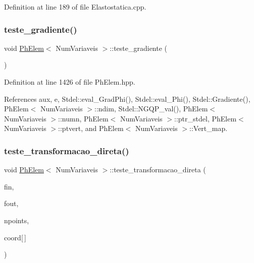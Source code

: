 Definition at line 189 of file Elastostatica.\+cpp.

\mbox{\label{classPhElem_adc3411d8b3a88f04004b6d48e64e9334}} 
\subsubsection{\texorpdfstring{teste\+\_\+gradiente()}{teste\_gradiente()}}
{\footnotesize\ttfamily void \hyperlink{classPhElem}{Ph\+Elem}$<$ Num\+Variaveis $>$\+::teste\+\_\+gradiente (\begin{DoxyParamCaption}{ }\end{DoxyParamCaption})\hspace{0.3cm}{\ttfamily [inherited]}}



Definition at line 1426 of file Ph\+Elem.\+hpp.



References aux, e, Stdel\+::eval\+\_\+\+Grad\+Phi(), Stdel\+::eval\+\_\+\+Phi(), Stdel\+::\+Gradiente(), Ph\+Elem$<$ Num\+Variaveis $>$\+::ndim, Stdel\+::\+N\+G\+Q\+P\+\_\+val(), Ph\+Elem$<$ Num\+Variaveis $>$\+::numn, Ph\+Elem$<$ Num\+Variaveis $>$\+::ptr\+\_\+stdel, Ph\+Elem$<$ Num\+Variaveis $>$\+::ptvert, and Ph\+Elem$<$ Num\+Variaveis $>$\+::\+Vert\+\_\+map.

\mbox{\label{classPhElem_a68e2ff863aa38d90933fc033e1fcec0e}} 
\subsubsection{\texorpdfstring{teste\+\_\+transformacao\+\_\+direta()}{teste\_transformacao\_direta()}}
{\footnotesize\ttfamily void \hyperlink{classPhElem}{Ph\+Elem}$<$ Num\+Variaveis $>$\+::teste\+\_\+transformacao\+\_\+direta (\begin{DoxyParamCaption}\item[{F\+I\+LE $\ast$}]{fin,  }\item[{F\+I\+LE $\ast$}]{fout,  }\item[{const int \&}]{npoints,  }\item[{const double}]{coord\mbox{[}$\,$\mbox{]} }\end{DoxyParamCaption})\hspace{0.3cm}{\ttfamily [inherited]}}

